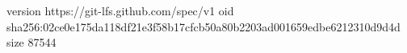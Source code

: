 version https://git-lfs.github.com/spec/v1
oid sha256:02ce0e175da118df21e3f58b17cfcb50a80b2203ad001659edbe6212310d9d4d
size 87544
